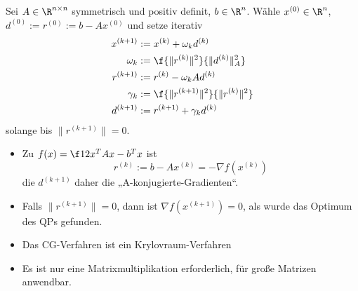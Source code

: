 \documentclass[11pt]{scrbook}
\begin{document}
\begin{df}[CG-Verfahren] \label{4.22}
	Sei $A \in \R^{n\times n}$ symmetrisch und positiv definit, $b \in \R^n$.
	Wähle $x^{(0)} \in \R^n$, $d^{(0)} := r^{(0)} := b - Ax^{(0)}$ und setze iterativ
	\begin{align*}
		x^{(k+1)} &:= x^{(k)} + \omega_k d^{(k)} \\
		\omega_k &:= \f {\|r^{(k)}\|^2}{\|d^{(k)}\|_A^2} \\
		r^{(k+1)} &:= r^{(k)} - \omega_k Ad^{(k)} \\
		\gamma_k &:= \f {\|r^{(k+1)}\|^2}{\|r^{(k)}\|^2} \\
		d^{(k+1)} &:= r^{(k+1)} + \gamma_k d^{(k)}
	\end{align*}
	solange bis $\|r^{(k+1)}\| = 0$.
	\begin{note}
		\begin{itemize}
			\item
				Zu $f(x) = \f 12 x^T A x - b^T x$ ist
				\[
					r^{(k)} := b - Ax^{(k)} = - \nabla f(x^{(k)})
				\]
				die $d^{(k+1)}$ daher die „A-konjugierte-Gradienten“.
			\item
				Falls $\|r^{(k+1)}\| = 0$, dann ist $\nabla f(x^{(k+1)}) = 0$, als wurde das Optimum des QPs gefunden.
			\item
				Das CG-Verfahren ist ein Krylovraum-Verfahren
			\item
				Es ist nur eine Matrixmultiplikation erforderlich, für große Matrizen anwendbar.
		\end{itemize}
	\end{note}
\end{df}
\end{document}
